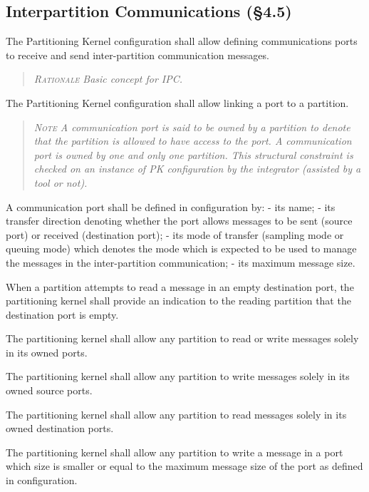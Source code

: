 \subsection{Interpartition Communications (\S4.5)}

The Partitioning Kernel configuration shall allow defining communications ports to receive and send inter-partition communication messages.
\begin{quote}\it
\textsc{Rationale}
Basic concept for IPC.
\end{quote}

The Partitioning Kernel configuration shall allow linking a port to a partition.
\begin{quote}\it
\textsc{Note}
A communication port is said to be owned by a partition to denote that the partition is allowed to have access to the port. A communication port is owned by one and only one partition. This structural constraint is checked on an instance of PK configuration by the integrator (assisted by a tool or not).
\end{quote}

A communication port shall be defined in configuration by:
- its name;
- its transfer direction denoting whether the port allows messages to be sent (source port) or received (destination port);
- its mode of transfer (sampling mode or queuing mode) which denotes the mode which is expected to be used to manage the messages in the inter-partition communication;
- its maximum message size.

When a partition attempts to read a message in an empty destination port, the partitioning kernel shall provide an indication to the reading partition that the destination port is empty.

The partitioning kernel shall allow any partition to read or write messages solely in its owned ports.

The partitioning kernel shall allow any partition to write messages solely in its owned source ports.

The partitioning kernel shall allow any partition to read messages solely in its owned destination ports.

The partitioning kernel shall allow any partition to write a message in a port which size is smaller or equal to the maximum message size of the port as defined in configuration.

